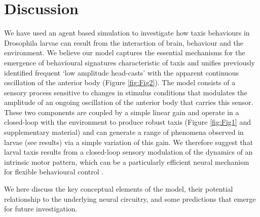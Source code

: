 \documentclass[10pt,a4paper]{article}
\begin{document}
\section{Discussion}
We have used an agent based simulation to investigate how taxis behaviours in Drosophila larvae can result from the interaction of brain, behaviour and the environment. We believe our model captures the essential mechanisms for the emergence of behavioural signatures characteristic of taxis and unifies previously identified frequent ‘low amplitude head-casts’ \citep{gomez2014multilevel} with the apparent continuous oscillation of the anterior body (Figure \ref{fig:Fig2}). %
 The model consists of a sensory process sensitive to changes in stimulus conditions that modulates the amplitude of an ongoing oscillation of the anterior body that carries this sensor.
These two components are coupled by a simple linear gain and operate in a closed-loop with the environment to produce robust taxis (Figure \ref{fig:Fig1} and supplementary material) and can generate a range of phenomena observed in larvae (see results) via a simple variation of this gain.
We therefore suggest that larval taxis results from a closed-loop sensory modulation of the dynamics of an intrinsic motor pattern, which can be a particularly efficient neural mechanism for flexible behavioural control \citep{lemon2015whole,izquierdo2010evolution,kanzaki1996behavioral,levi2005role,willis1997active}. 

 We here discuss the key conceptual elements of the model, their potential relationship to the underlying neural circuitry, and some predictions that emerge for future investigation.
\end{document}
